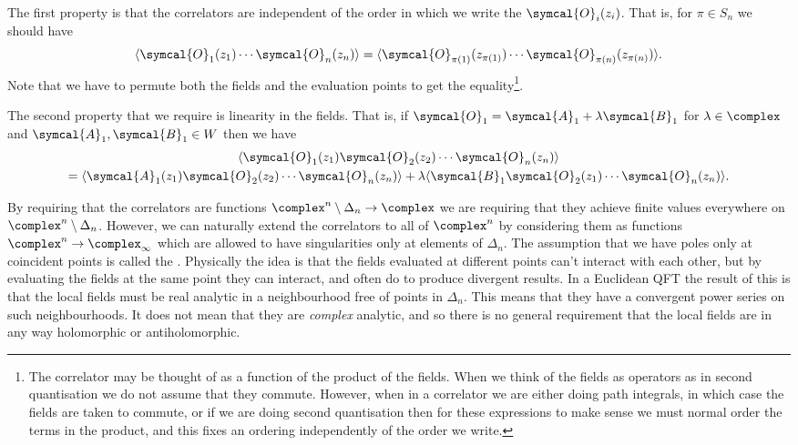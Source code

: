\documentclass[fleqn]{NotesClass}
\newcommand{\quantumField}[1]{\symcal{#1}}
\DeclarePairedDelimiter{\correlator}{\langle}{\rangle}
\begin{document}
    The first property is that the correlators are independent of the order in which we write the \(\quantumField{O}_i(z_i)\).
    That is, for \(\pi \in S_n\) we should have
    \begin{equation}
        \correlator{\quantumField{O}_1(z_1) \dotsm \quantumField{O}_n(z_n)} = \correlator{\quantumField{O}_{\pi(1)}(z_{\pi(1)}) \dotsm \quantumField{O}_{\pi(n)}(z_{\pi(n)})}.
    \end{equation}
    Note that we have to permute both the fields and the evaluation points to get the equality\footnote{The correlator may be thought of as a function of the product of the fields. When we think of the fields as operators as in second quantisation we do not assume that they commute. However, when in a correlator we are either doing path integrals, in which case the fields are taken to commute, or if we are doing second quantisation then for these expressions to make sense we must normal order the terms in the product, and this fixes an ordering independently of the order we write.}.
    
    The second property that we require is linearity in the fields.
    That is, if \(\quantumField{O}_1 = \quantumField{A}_1 + \lambda \quantumField{B}_1\) for \(\lambda \in \complex\) and \(\quantumField{A}_1, \quantumField{B}_1 \in W\) then we have
    \begin{multline}
        \correlator{\quantumField{O}_1(z_1) \quantumField{O}_2(z_2) \dotsm \quantumField{O}_n(z_n)}\\
        = \correlator{\quantumField{A}_1(z_1) \quantumField{O}_2(z_2) \dotsm \quantumField{O}_n(z_n)} + \lambda \correlator{\quantumField{B}_1 \quantumField{O}_2(z_1) \dotsm \quantumField{O}_n(z_n)}.
    \end{multline}
    
    By requiring that the correlators are functions \(\complex^n\setminus \Delta_n \to \complex\) we are requiring that they achieve finite values everywhere on \(\complex^n\setminus \Delta_n\).
    However, we can naturally extend the correlators to all of \(\complex^n\) by considering them as functions \(\complex^n \to \complex_{\infty}\) which are allowed to have singularities only at elements of \(\Delta_n\).
    The assumption that we have poles only at coincident points is called the .
    Physically the idea is that the fields evaluated at different points can't interact with each other, but by evaluating the fields at the same point they can interact, and often do to produce divergent results.
    In a Euclidean QFT the result of this is that the local fields must be real analytic in a neighbourhood free of points in \(\Delta_n\).
    This means that they have a convergent power series on such neighbourhoods.
    It does not mean that they are \emph{complex} analytic, and so there is no general requirement that the local fields are in any way holomorphic or antiholomorphic.
    
\end{document}
